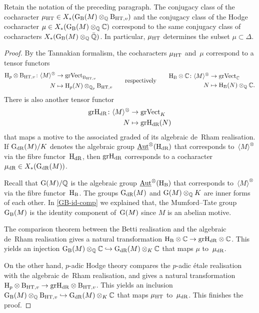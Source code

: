 \documentclass[10pt,twoside,leqno]{article}
\numberwithin{equation}{subsection}
\newcommand{\into}{\hookrightarrow}
\newcommand{\Aut}{\textnormal{Aut}}
\newcommand{\iAut}{\underline{\Aut}}
\newcommand{\QQ}{\mathbb{Q}}
\newcommand{\QQbar}{\bar{\QQ}}
\newcommand{\QQp}{\QQ_{p}}
\newcommand{\CC}{\mathbb{C}}
\newcommand{\HdR}{\HH_{\dR}}
\newcommand{\HT}{\textnormal{HT}}
\newcommand{\BHT}[1]{\textnormal{B}_{\HT,#1}}
\newcommand{\gr}{\textnormal{gr}}
\newcommand{\GdR}{\GG_{\dR}}
\newcommand{\grVect}{\textnormal{grVect}}
\newcommand{\dR}{\textnormal{dR}}
\newcommand{\HH}{\textnormal{H}}
\newcommand{\Hp}{\HH_{p}}
\newcommand{\HB}{\HH_{\textnormal{B}}}
\newcommand{\GG}{\textnormal{G}}
\newcommand{\GB}{\GG_{\textnormal{B}}}
\newcommand{\Tangen}[1]{\langle #1 \rangle^{\otimes}}
\begin{document}
\begin{lemma} %
 \label{hodge-tate-cochar-deldyn}
 Retain the notation of the preceding paragraph.
 The conjugacy class of the cocharacter
 $\mu_\HT \in X_*(\GB(M) \otimes_\QQ \BHT{v})$
 and
 the conjugacy class of the Hodge cocharacter
 $\mu \in X_*(\GB(M) \otimes_\QQ \CC)$
 correspond to the same conjugacy class of
 cocharacters $X_*(\GB(M) \otimes_\QQ \QQbar)$.
 In particular, $\mu_\HT$ determines the subset $\mu \subset \Delta$.
 \begin{proof}
  By the Tannakian formalism,
  the cocharacters $\mu_\HT$ and~$\mu$ correspond to a tensor functors
  \[
   \begin{aligned}
    \Hp \otimes \BHT{v} \colon \Tangen{M} &\to \grVect_{\BHT{v}} \\
    N &\mapsto \Hp(N) \otimes_{\QQp} \BHT{v}
   \end{aligned}
   \qquad\text{respectively}\qquad
   \begin{aligned}
    \HB \otimes \CC \colon \Tangen{M} &\to \grVect_{\CC} \\
    N &\mapsto \HB(N) \otimes_\QQ \CC.
   \end{aligned}
  \]
  There is also another tensor functor
  \begin{align*}
   \gr\HdR \colon \Tangen{M} &\to \grVect_{K} \\
   N &\mapsto \gr\HdR(N)
  \end{align*}
  that maps a motive to the associated graded
  of its algebraic de~Rham realisation.
  If $\GdR(M)/K$ denotes the algebraic group $\iAut^\otimes(\HdR)$
  that corresponds to~$\Tangen{M}$ via the fibre functor~$\HdR$,
  then $\gr\HdR$ corresponds to a cocharacter $\mu_\dR \in X_*(\GdR(M))$.

  Recall that $\GG(M)/\QQ$ is the algebraic group $\iAut^\otimes(\HB)$
  that corresponds to~$\Tangen{M}$ via the fibre functor~$\HB$.
  The groups $\GdR(M)$ and $\GG(M) \otimes_\QQ K$ are inner forms of each other.
  In \cref{GB-id-comp} we explained that,
  the Mumford--Tate group $\GB(M)$ is the identity component of~$\GG(M)$
  since $M$ is an abelian motive.

  The comparison theorem between
  the Betti realisation
  and
  the algebraic de~Rham realisation
  gives a natural transformation $\HB \otimes \CC \to \gr\HdR \otimes \CC$.
  This yields an injection $\GB(M) \otimes_\QQ \CC \into \GdR(M) \otimes_K \CC$
  that maps $\mu$ to~$\mu_\dR$.

  On the other hand, $p$-adic Hodge theory compares
  the $p$-adic \'etale realisation with the algebraic de~Rham realisation,
  and gives a natural transformation
  $\Hp \otimes \BHT{v} \to \gr\HdR \otimes \BHT{v}$.
  This yields an inclusion
  $\GB(M) \otimes_\QQ \BHT{v} \into \GdR(M) \otimes_K \CC$
  that maps $\mu_\HT$ to~$\mu_\dR$.
  This finishes the proof.
 \end{proof}
\end{lemma}
\end{document}
